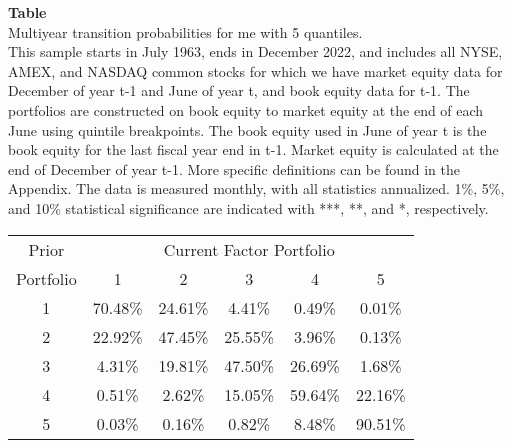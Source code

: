 \begin{table*}[ht!]
\raggedright
{}
\label{tab: multiyear_transition_probs_me_with_5_quantiles}
\textbf{Table \thetable} \\
Multiyear transition probabilities for me with 5 quantiles. \\
\hspace*{1em}This sample starts in July 1963, ends in December 2022, and includes all NYSE, AMEX, and NASDAQ common stocks for which we have market equity data for December of year t-1 and June of year t, and book equity data for t-1. The portfolios are constructed on book equity to market equity at the end of each June using quintile breakpoints.  The book equity used in June of year t is the book equity for the last fiscal year end in t-1.  Market equity is calculated at the end of December of year t-1.  More specific definitions can be found in the Appendix.  The data is measured monthly, with all statistics annualized.  1\%, 5\%, and 10\% statistical significance are indicated with ***, **, and *, respectively. \\
\vspace{0.5em}
\centering
\begin{adjustbox}{max width=\textwidth}
\begin{tabular}{@{}cccccc@{}}
\toprule
Prior & \multicolumn{5}{c}{Current Factor Portfolio} \\
Portfolio & 1 & 2 & 3 & 4 & 5 \\
\midrule
1 & 70.48\% & 24.61\% & 4.41\% & 0.49\% & 0.01\% \\
2 & 22.92\% & 47.45\% & 25.55\% & 3.96\% & 0.13\% \\
3 & 4.31\% & 19.81\% & 47.50\% & 26.69\% & 1.68\% \\
4 & 0.51\% & 2.62\% & 15.05\% & 59.64\% & 22.16\% \\
5 & 0.03\% & 0.16\% & 0.82\% & 8.48\% & 90.51\% \\
\bottomrule
\end{tabular}
\end{adjustbox}
\end{table*}